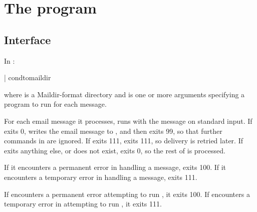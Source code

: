 
\chapter{The  program}

\section{Interface}
In :
\begin{code}
  | condtomaildir  
\end{code}
where  is a Maildir-format directory and  is one
or more arguments specifying a program to run for each message.

For each email message it processes,  runs
 with the message on standard input.  If  exits
0,  writes the email message to , and
then exits 99, so that further commands in  are ignored.
If  exits 111,  exits 111, so delivery
is retried later. If  exits anything else, or does not
exist,  exits 0, so the rest of  is
processed.

If it encounters a permanent error in handling a message,
 exits 100.  If it encounters a temporary
error in handling a message,  exits 111.


If  encounters a permanent error attempting to run
, it exits 100.  If  encounters a
temporary error in attempting to run , it exits 111.

